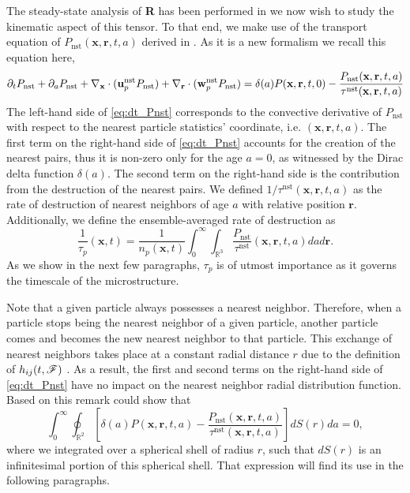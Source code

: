The steady-state analysis of \textbf{R} has been performed in \citet{fintzi2024buoyancy} we now wish to study the kinematic aspect of this tensor. 
To that end, we make use of the transport equation of $P_\text{nst}(\textbf{x},\textbf{r},t,a)$ derived in \citet{zhang2023evolution}.
As it is a new formalism we recall this equation here, 
\begin{equation}
    \pddt P_\text{nst}
    + \pdda P_\text{nst}
    + \pddx \cdot  (\textbf{u}^\text{nst}_p P_\text{nst})
    + \pddr \cdot  (\textbf{w}^\text{nst}_p P_\text{nst})
    = \delta(a)P(\textbf{x},\textbf{r},t,0)
    - \frac{P_\text{nst}(\textbf{x},\textbf{r},t,a)}{\tau^\text{nst}(\textbf{x},\textbf{r},t,a)}
    \label{eq:dt_Pnst}
\end{equation}
The left-hand side of \ref{eq:dt_Pnst} corresponds to the convective derivative of $P_\text{nst}$ with respect to the nearest particle statistics' coordinate, i.e. $(\textbf{x},\textbf{r},t,a)$. 
The first term on the right-hand side of \ref{eq:dt_Pnst} accounts for the creation of the nearest pairs, thus it is non-zero only for the age $a = 0$, as witnessed by the Dirac delta function $\delta(a)$. 
The second term on the right-hand side is the contribution from the destruction of the nearest pairs.
We defined $1/\tau^\text{nst}(\textbf{x},\textbf{r},t,a)$ as the rate of destruction of nearest neighbors of age $a$ with relative position $\textbf{r}$.
Additionally, we define the ensemble-averaged rate of destruction as
\begin{equation}
    \frac{1}{\tau_p}(\textbf{x},t) = 
    \frac{1}{n_p(\textbf{x},t)}
    \int_{0}^\infty
    \int_{\mathbb{R}^3}
    \frac{P_\text{nst} }{\tau^\text{nst}}(\textbf{x},\textbf{r},t,a)
    da d\textbf{r}. 
    \label{eq:tau_p}
\end{equation}
As we show in the next few paragraphs, $\tau_p$ is of utmost importance as it governs the timescale of the microstructure.

Note that a given particle always possesses a nearest neighbor.
Therefore, when a particle stops being the nearest neighbor of a given particle, another particle comes and becomes the new nearest neighbor to that particle.
This exchange of nearest neighbors takes place at a constant radial distance $r$ due to the definition of $h_{ij}(t,\mathscr{F})$ \citep{zhang2021ensemble}. 
As a result, the first and second terms on the right-hand side of \ref{eq:dt_Pnst} have no impact on the nearest neighbor radial distribution function. 
Based on this remark \citep{zhang2023evolution} could show that
\begin{equation}
    \int_{0}^{\infty}\oint_{\mathbb{R}^2}\left[
        \delta(a)P(\textbf{x},\textbf{r},t,a)
    - \frac{P_\text{nst}(\textbf{x},\textbf{r},t,a)}{\tau^\text{nst}(\textbf{x},\textbf{r},t,a)}
    \right]dS(r) da    
    =0,
    \label{eq:int_dt_h}
\end{equation}
where we integrated over a spherical shell of radius $r$, such that $dS(r)$ is an infinitesimal portion of this spherical shell. 
That expression will find its use in the following paragraphs. 


